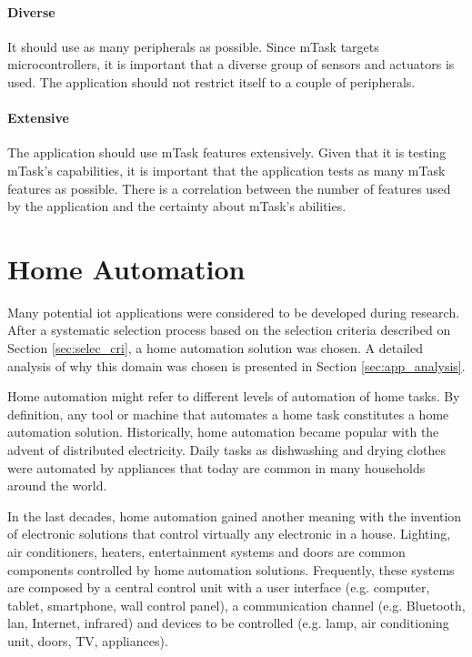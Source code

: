 \paragraph{Diverse} It should use as many peripherals as possible. Since \gls{mTask} targets microcontrollers, it is important that a diverse group of sensors and actuators is used. The application should not restrict itself to a couple of peripherals. 

\paragraph{Extensive} The application should use \gls{mTask} features extensively. Given that it is testing \gls{mTask}'s capabilities, it is important that the application tests as many \gls{mTask} features as possible. There is a correlation between the number of features used by the application and the certainty about \gls{mTask}'s abilities.

\section{Home Automation}

Many potential \ac{iot} applications were considered to be developed during research. After a systematic selection process based on the selection criteria described on Section \ref{sec:selec_cri}, a home automation solution was chosen. A detailed analysis of why this domain was chosen is presented in Section \ref{sec:app_analysis}.

Home automation might refer to different levels of automation of home tasks. By definition, any tool or machine that automates a home task constitutes a home automation solution. Historically, home automation became popular with the advent of distributed electricity. Daily tasks as dishwashing and drying clothes were automated by appliances that today are common in many households around the world.

In the last decades, home automation gained another meaning with the invention of electronic solutions that control virtually any electronic in a house. Lighting, air conditioners, heaters, entertainment systems and doors are common components controlled by home automation solutions. Frequently, these systems are composed by a central control unit with a user interface (e.g. computer, tablet, smartphone, wall control panel), a communication channel (e.g. Bluetooth, \acs{lan}, Internet, infrared) and devices to be controlled (e.g. lamp, air conditioning unit, doors, TV, appliances).

